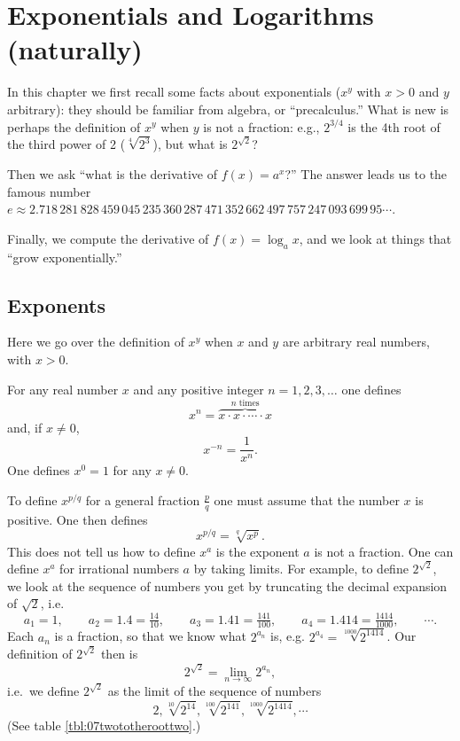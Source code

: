 \chapter{Exponentials and Logarithms (naturally)}
\label{ch:exponentials}
In this chapter we first recall some facts about exponentials ($x^y$ with $x>0$
and $y$ arbitrary): they should be familiar from algebra, or ``precalculus.''
What is new is perhaps the definition of $x^y$ when $y$ is not a fraction: e.g.,
$2^{3/4}$ is the 4th root of the third power of 2 ($\sqrt[4]{2^3}$), but what is
$2^{\surd2}$?

Then we ask ``what is the derivative of $f(x)=a^x$?'' The answer leads us to the
famous number $e\approx 2.718\, 281\, 828\, 459\, 045\, 235\, 360\, 287\, 471\,
352\, 662\, 497\, 757\, 247\, 093\, 699\, 95\cdots$.

Finally, we compute the derivative of $f(x)=\log_a x$, and we look at things
that ``grow exponentially.''

\section{Exponents}
Here we go over the definition of $x^y$ when $x$ and $y$ are arbitrary
real numbers, with $x>0$.

For any real number $x$ and any positive integer $n=1, 2, 3, \ldots$ one defines
\[
x^n = \overbrace{x\cdot x\cdot \cdots \cdot x}^{\text{$n$ times}}
\]
and, if $x\neq0$,
\[
x^{-n} = \frac1{x^n}.
\]
One defines $x^0=1$ for any $x\ne0$.

To define $x^{p/q}$ for a general fraction $\frac p q$ one must assume
that the number $x$ is positive. One then defines
\begin{equation}\label{eq:pqpowerofx-def}
  x^{p/q}= \sqrt[q]{x^p}.
\end{equation}
This does not tell us how to define $x^a$ is the exponent $a$ is not a fraction.
One can define $x^a$ for irrational numbers $a$ by taking limits.  For example,
to define $2^{\surd2}$, we look at the sequence of numbers you get by truncating
the decimal expansion of $\surd 2$, i.e.
\[
a_1 = 1,
\qquad   a_2= 1.4=\tfrac{14}{10}, 
\qquad    a_3=1.41=\tfrac{141}{100}, 
\qquad a_4= 1.414=\tfrac{1414}{1000},
\qquad   \cdots.
\]
Each $a_n$ is a fraction, so that we know what $2^{a_n}$ is, e.g.
$2^{a_4} = \sqrt[1000]{2^{1414}}$.  Our definition of $2^{\surd 2}$ then is
\[
2^{\surd 2} = \lim_{n\to\infty} 2^{a_n},
\]
i.e.\ we define $2^{\surd 2}$ as the limit of the sequence of numbers
\[
2, \sqrt[10]{2^{14}}, \sqrt[100]{2^{141}}, \sqrt[1000]{2^{1414}}, \cdots
\]
(See table \ref{tbl:07twototheroottwo}.)

